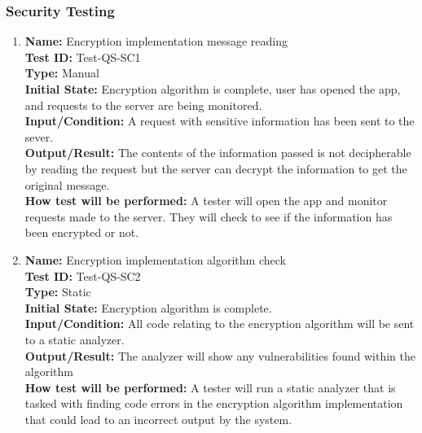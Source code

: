 \documentclass[12pt, titlepage]{article}
\begin{document}
\begin{enumerate}
\subsubsection{Security Testing}

\begin{enumerate}

    \item
    \textbf{Name:} Encryption implementation message reading \label{itm:Test-QS-SC1} \\
    \textbf{Test ID:} Test-QS-SC1 \\
    \textbf{Type:} Manual \\
    \textbf{Initial State:} Encryption algorithm is complete, user has opened the app, and requests to the server are being monitored. \\
    \textbf{Input/Condition:} A request with sensitive information has been sent to the sever. \\
    \textbf{Output/Result:} The contents of the information passed is not decipherable by reading the request but the server can decrypt the information to get the original message. \\
    \textbf{How test will be performed:} A tester will open the app and monitor requests made to the server. They will check to see if the information has been encrypted or not.

    \item
    \textbf{Name:} Encryption implementation algorithm check \label{itm:Test-QS-SC2} \\
    \textbf{Test ID:} Test-QS-SC2 \\
    \textbf{Type:} Static \\
    \textbf{Initial State:} Encryption algorithm is complete. \\
    \textbf{Input/Condition:} All code relating to the encryption algorithm will be sent to a static analyzer. \\
    \textbf{Output/Result:} The analyzer will show any vulnerabilities found within the algorithm \\
    \textbf{How test will be performed:} A tester will run a static analyzer that is tasked with finding code errors in the encryption algorithm implementation that could lead to an incorrect output by the system.


\end{enumerate}
\end{enumerate}
\end{document}
